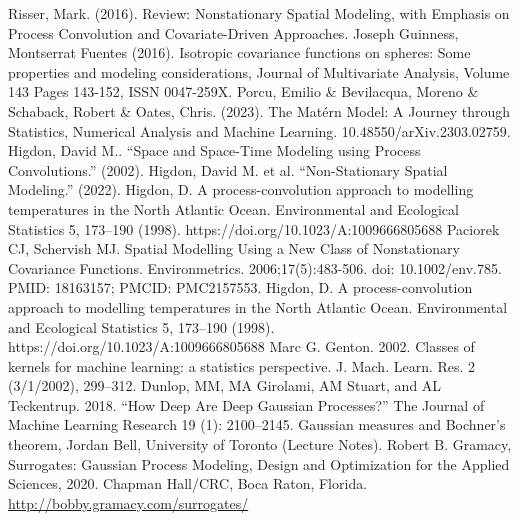 \documentclass[12pt]{article}
\begin{document}
\begin{thebibliography}{20}
 Risser, Mark. (2016). Review: Nonstationary Spatial Modeling, with Emphasis on Process Convolution and Covariate-Driven Approaches. 
 Joseph Guinness, Montserrat Fuentes (2016). Isotropic covariance functions on spheres: Some properties and modeling considerations, Journal of Multivariate Analysis, Volume 143
Pages 143-152, ISSN 0047-259X.
 Porcu, Emilio \& Bevilacqua, Moreno \& Schaback, Robert \& Oates, Chris. (2023). The Mat\'ern Model: A Journey through Statistics, Numerical Analysis and Machine Learning. 10.48550/arXiv.2303.02759. 
 Higdon, David M.. “Space and Space-Time Modeling using Process Convolutions.” (2002).
 Higdon, David M. et al. “Non-Stationary Spatial Modeling.” (2022).
 Higdon, D. A process-convolution approach to modelling temperatures in the North Atlantic Ocean. Environmental and Ecological Statistics 5, 173–190 (1998). https://doi.org/10.1023/A:1009666805688
 Paciorek CJ, Schervish MJ. Spatial Modelling Using a New Class of Nonstationary Covariance Functions. Environmetrics. 2006;17(5):483-506. doi: 10.1002/env.785. PMID: 18163157; PMCID: PMC2157553.
 Higdon, D. A process-convolution approach to modelling temperatures in the North Atlantic Ocean. Environmental and Ecological Statistics 5, 173–190 (1998). https://doi.org/10.1023/A:1009666805688
 Marc G. Genton. 2002. Classes of kernels for machine learning: a statistics perspective. J. Mach. Learn. Res. 2 (3/1/2002), 299–312.
 Dunlop, MM, MA Girolami, AM Stuart, and AL Teckentrup. 2018. “How Deep Are Deep Gaussian Processes?” The Journal of Machine Learning Research 19 (1): 2100–2145.
 Gaussian measures and Bochner’s theorem, Jordan Bell, University of Toronto (Lecture Notes). 
 Robert B. Gramacy, Surrogates: Gaussian Process Modeling, Design and Optimization for the Applied Sciences, 2020. Chapman Hall/CRC, Boca Raton, Florida. \url{http://bobby.gramacy.com/surrogates/}

\end{thebibliography}
\end{document}
